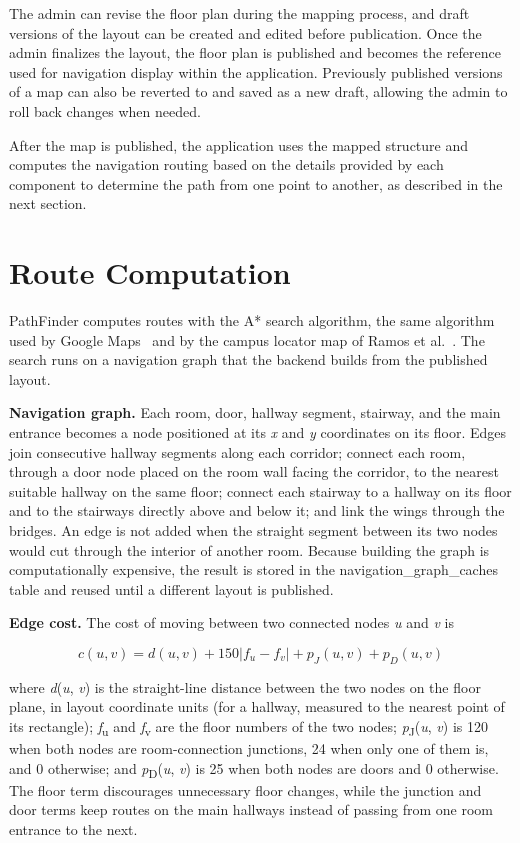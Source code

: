 The admin can revise the floor plan during the mapping process, and draft
versions of the layout can be created and edited before publication. Once the
admin finalizes the layout, the floor plan is published and becomes the
reference used for navigation display within the application. Previously
published versions of a map can also be reverted to and saved as a new draft,
allowing the admin to roll back changes when needed.

After the map is published, the application uses the mapped structure and
computes the navigation routing based on the details provided by each component
to determine the path from one point to another, as described in the next
section.

\section{Route Computation}\label{sec:4.4}

PathFinder computes routes with the A* search algorithm, the same algorithm used
by Google Maps~\cite{ref06} and by the campus locator map of Ramos et
al.~\cite{ref10}. The search runs on a navigation graph that the backend builds
from the published layout.

\textbf{Navigation graph.} Each room, door, hallway segment, stairway, and the
main entrance becomes a node positioned at its \emph{x} and \emph{y} coordinates
on its floor. Edges join consecutive hallway segments along each corridor;
connect each room, through a door node placed on the room wall facing the
corridor, to the nearest suitable hallway on the same floor; connect each
stairway to a hallway on its floor and to the stairways directly above and below
it; and link the wings through the bridges. An edge is not added when the
straight segment between its two nodes would cut through the interior of another
room. Because building the graph is computationally expensive, the result is
stored in the navigation\_graph\_caches table and reused until a different
layout is published.

\textbf{Edge cost.} The cost of moving between two connected nodes \emph{u} and
\emph{v} is

\begin{equation}
\label{eq:4.1}
c(u,v) = d(u,v) + 150|f_{u} - f_{v}| + p_{J}(u,v) + p_{D}(u,v)
\end{equation}

\noindent where \emph{d}(\emph{u}, \emph{v}) is the straight-line distance
between the two nodes on the floor plane, in layout coordinate units (for a
hallway, measured to the nearest point of its rectangle);
\emph{f}\textsubscript{u} and \emph{f}\textsubscript{v} are the floor numbers of
the two nodes; \emph{p}\textsubscript{J}(\emph{u}, \emph{v}) is 120 when both
nodes are room-connection junctions, 24 when only one of them is, and 0
otherwise; and \emph{p}\textsubscript{D}(\emph{u}, \emph{v}) is 25 when both
nodes are doors and 0 otherwise. The floor term discourages unnecessary floor
changes, while the junction and door terms keep routes on the main hallways
instead of passing from one room entrance to the next.

